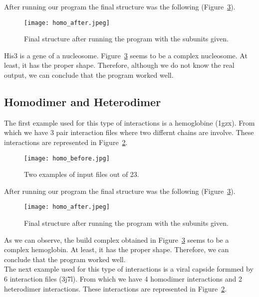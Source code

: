 \documentclass[a4paper,10pt]{report}
\begin{document}
\noindent
After running our program the final structure was the following (Figure~\ref{fig:4}).\\

\begin{figure}[h]
\centering
\texttt{[image: homo\_after.jpeg]}
\caption{Final structure after running the program with the subunits given.}
\label{fig:4}
\end{figure}

\noindent
His3 is a gene of a nucleosome. Figure~\ref{fig:4} seems to be a complex nucleosome. At least, it has the proper shape. Therefore, although we do not know the real output, we can conclude that the program worked well.\\

\newpage

\subsection{Homodimer and Heterodimer}

The first example used for this type of interactions is a hemoglobine (1gzx). From which we have 3 pair interaction files where two differnt chains are involve. These interactions are represented in Figure~\ref{fig:3}.\\

\begin{figure}[h]
\texttt{[image: homo\_before.jpg]}
\centering
\caption{Two examples of input files out of 23.}
\label{fig:3}
\end{figure}

\noindent
After running our program the final structure was the following (Figure~\ref{fig:4}).\\

\begin{figure}[h]
\centering
\texttt{[image: homo\_after.jpeg]}
\caption{Final structure after running the program with the subunits given.}
\label{fig:4}
\end{figure}

\noindent
As we can observe, the build complex obtained in Figure~\ref{fig:4} seems to be a complex hemoglobin. At least, it has the proper shape. Therefore, we can conclude that the program worked well.\\

The next example used for this type of interactions is a viral capside formmed by 6 interaction files (3j7l). From which we have 4 homodimer interactions and 2 heterodimer interactions. These interactions are represented in Figure~\ref{fig:3}.\\
\end{document}
